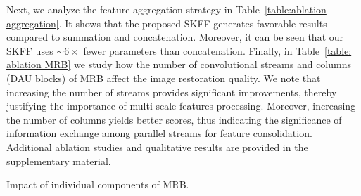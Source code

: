 \documentclass[runningheads]{llncs}
\begin{document}
Next, we analyze the feature aggregation strategy in Table~\ref{table:ablation aggregation}. It shows that the proposed SKFF generates favorable results compared to summation and concatenation. Moreover, it can be seen that our SKFF uses $\sim6\times$ fewer parameters than concatenation. 
Finally, in Table~\ref{table: ablation MRB} we study how the number of convolutional streams and columns (DAU blocks) of MRB affect the image restoration quality. 
We note that increasing the number of streams provides significant improvements, thereby justifying the importance of multi-scale features processing. Moreover, increasing the number of columns yields better scores, thus indicating the significance of information exchange among parallel streams for feature consolidation.   
Additional ablation studies and qualitative results are provided in the supplementary material.

\begin{table}[t]
\parbox{.45\linewidth}{
\centering
\caption{\small Impact of individual components of MRB.}
\label{table:ablation main}
\setlength{\tabcolsep}{2pt}
}
\hfill
\parbox{.48\linewidth}{
\centering
\caption{\small Feature aggregation. Our SKFF uses $\sim6\times$ fewer parameters than concat, but generates better results. }
\label{table:ablation aggregation}
\setlength{\tabcolsep}{12.5pt}
}
\vspace*{-1.5em}
\end{table}
\end{document}
